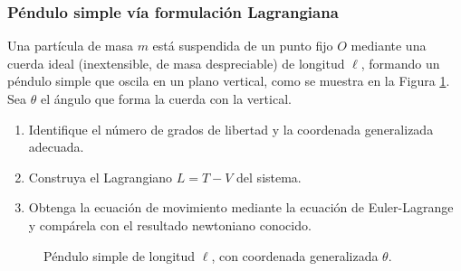 \subsubsection{Péndulo simple vía formulación Lagrangiana}

Una partícula de masa $m$ está suspendida de un punto fijo $O$ mediante una cuerda ideal (inextensible, de masa despreciable) de longitud $\ell$, formando un péndulo simple que oscila en un plano vertical, como se muestra en la Figura \ref{fig:c5_e01_p01_pendulo_simple}. Sea $\theta$ el ángulo que forma la cuerda con la vertical.

\begin{enumerate}
    \item Identifique el número de grados de libertad y la coordenada generalizada adecuada.
    \item Construya el Lagrangiano $L = T - V$ del sistema.
    \item Obtenga la ecuación de movimiento mediante la ecuación de Euler-Lagrange y compárela con el resultado newtoniano conocido.
\end{enumerate}

\begin{figure}[!ht]
    \centering
    \caption{Péndulo simple de longitud $\ell$, con coordenada generalizada $\theta$.}
    \label{fig:c5_e01_p01_pendulo_simple}
\end{figure}


